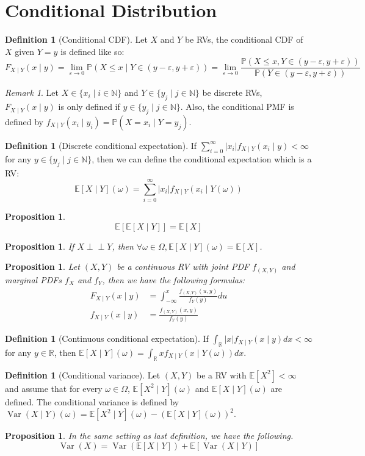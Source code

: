 \documentclass[paper=a4, fontsize=12pt]{scrartcl} %
\newcommand{\bra}[1]{\left(#1\right)}
\newtheorem{prop}[thm]{Proposition}
\theoremstyle{definition}
\newtheorem{defn}[thm]{Definition}
\theoremstyle{remark}
\newtheorem{rem}[thm]{Remark}
\newcommand{\R}{\mathbb{R}}
\newcommand{\N}{\mathbb{N}}
\newcommand{\E}{\mathbb{E}}
\newcommand{\Perp}{\perp\!\!\!\perp}
\renewcommand{\P}{\mathbb{P}}
\DeclareMathOperator{\vari}{Var}
\numberwithin{equation}{section} %
\numberwithin{figure}{section} %
\numberwithin{table}{section} %
\begin{document}
\section{Conditional Distribution}
\begin{defn}[Conditional CDF]
	Let $X$ and $Y$ be RVs, the conditional CDF of $X$ given $Y = y$ is defined like so:
	\[F_{X\mid Y}(x \mid y) = \lim_{\varepsilon\rightarrow 0} \P(X \leq x \mid Y \in (y-\varepsilon,y+\varepsilon)) = \lim_{\varepsilon\rightarrow 0} \frac{\P(X \leq x, Y \in (y-\varepsilon,y+\varepsilon))}{\P(Y \in (y-\varepsilon,y+\varepsilon))}\]
\end{defn}
\begin{rem}
	Let $X \in \{x_i \mid i \in \N\}$ and $Y \in \{y_j \mid j \in \N\}$ be discrete RVs, $F_{X \mid Y}(x \mid y)$ is only defined if $y \in \{y_j \mid j \in \N\}$. Also, the conditional PMF is defined by $f_{X \mid Y}(x_i \mid y_i) = \P(X = x_i \mid Y = y_j)$.
\end{rem}
\begin{defn}[Discrete conditional expectation]
	If $\sum_{i=0}^{\infty} |x_i|f_{X\mid Y}(x_i \mid y) < \infty$ for any $y \in \{y_j \mid j \in \N\}$, then we can define the conditional expectation which is a RV:
	\[ \E[X \mid Y](\omega) = \sum_{i=0}^{\infty} |x_i|f_{X\mid Y}(x_i \mid Y(\omega)) \]
\end{defn}
\begin{prop}
	\[ \E[\E[X\mid Y]] = \E[X] \]
\end{prop}
\begin{prop}
	If $X \Perp Y$, then $\forall \omega \in \Omega, \E[X \mid Y](\omega) = \E[X]$.
\end{prop}
\begin{prop}
	Let $(X,Y)$ be a continuous RV with joint PDF $f_{(X,Y)}$ and marginal PDFs $f_X$ and $f_Y$, then we have the following formulas:
	\begin{align*}
		F_{X \mid Y}(x \mid y) &= \int_{-\infty}^x \frac{f_{(X,Y)}(u,y)}{f_Y(y)}du\\
		f_{X \mid Y}(x \mid y) &= \frac{f_{(X,Y)}(x,y)}{f_Y(y)}
	\end{align*}
\end{prop}
\begin{defn}[Continuous conditional expectation]
	If $\int_{\R}|x|f_{X \mid Y}(x\mid y)dx < \infty$ for any $y \in \R$, then $\E[X \mid Y](\omega) = \int_{\R}xf_{X \mid Y}(x \mid Y(\omega))dx$.
\end{defn}
\begin{defn}[Conditional variance]
	Let $(X,Y)$ be a RV with $\E[X^2] < \infty$ and assume that for every $\omega \in \Omega$, $\E[X^2\mid Y](\omega)$ and $\E[X\mid Y](\omega)$ are defined. The conditional variance is defined by $\vari(X\mid Y)(\omega) = \E[X^2\mid Y](\omega) - \bra{\E[X \mid Y](\omega)}^2$.
\end{defn}
\begin{prop}
	In the same setting as last definition, we have the following.
	\[ \vari(X) = \vari(\E[X\mid Y]) + \E[\vari(X \mid Y)] \]
\end{prop}
\end{document}
